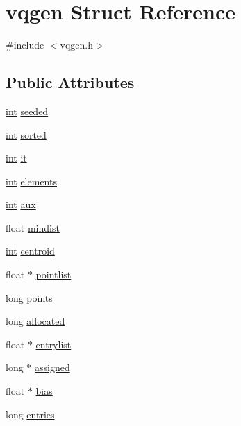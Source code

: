 \hypertarget{structvqgen}{}\section{vqgen Struct Reference}
\label{structvqgen}


{\ttfamily \#include $<$vqgen.\+h$>$}

\subsection*{Public Attributes}
\begin{DoxyCompactItemize}
\item 
\hyperlink{xmltok_8h_a5a0d4a5641ce434f1d23533f2b2e6653}{int} \hyperlink{structvqgen_a38dc058d04e964502a0bf9720cc65e07}{seeded}
\item 
\hyperlink{xmltok_8h_a5a0d4a5641ce434f1d23533f2b2e6653}{int} \hyperlink{structvqgen_a9593a45a916e6dc0d0be9d90560f627a}{sorted}
\item 
\hyperlink{xmltok_8h_a5a0d4a5641ce434f1d23533f2b2e6653}{int} \hyperlink{structvqgen_adb814cb412b03818ad038401926a875e}{it}
\item 
\hyperlink{xmltok_8h_a5a0d4a5641ce434f1d23533f2b2e6653}{int} \hyperlink{structvqgen_ae9cf105abbc253ea85749b1a3c542967}{elements}
\item 
\hyperlink{xmltok_8h_a5a0d4a5641ce434f1d23533f2b2e6653}{int} \hyperlink{structvqgen_a0552a2f8ee4b71b1e5f81b7a9ed04165}{aux}
\item 
float \hyperlink{structvqgen_aa72b518c7597827d46cadcbf321ae176}{mindist}
\item 
\hyperlink{xmltok_8h_a5a0d4a5641ce434f1d23533f2b2e6653}{int} \hyperlink{structvqgen_aec939b5c1ed9121f1ac1ecd36ed77c85}{centroid}
\item 
float $\ast$ \hyperlink{structvqgen_ab8f1a19f76873f65c36500d1ddf9a44d}{pointlist}
\item 
long \hyperlink{structvqgen_a95e0e94fc47cf59d894937e2a5695fec}{points}
\item 
long \hyperlink{structvqgen_a49b5acee4eece16cf03b84e05e40c748}{allocated}
\item 
float $\ast$ \hyperlink{structvqgen_a5ee8b3519eb4f79d5a5216f915d5b307}{entrylist}
\item 
long $\ast$ \hyperlink{structvqgen_af5cf3711c7395b27eb60442079cc1314}{assigned}
\item 
float $\ast$ \hyperlink{structvqgen_a732fdab429939b8aea11f4ebc09f7b0d}{bias}
\item 
long \hyperlink{structvqgen_a1e787843315b3dfd83e0eaa9e5711043}{entries}

\end{DoxyCompactItemize}

